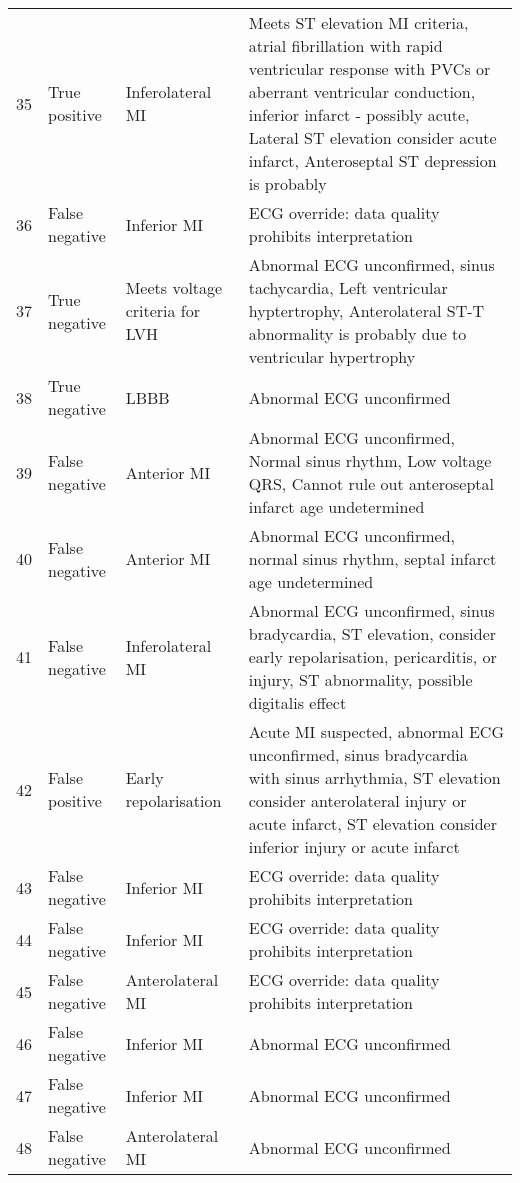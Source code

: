 \begin{longtable}[c]{Lp{0.18\textwidth}AA}
35&True positive&Inferolateral MI&Meets ST elevation MI criteria,  \newline  atrial fibrillation with rapid ventricular response with PVCs or aberrant ventricular conduction,  \newline  inferior infarct - possibly acute, \newline  Lateral ST elevation consider acute infarct, Anteroseptal ST depression is probably \\
36&False negative&Inferior MI&ECG override: data quality prohibits interpretation \\
37&True negative&Meets voltage criteria for LVH&Abnormal ECG unconfirmed, sinus tachycardia,  \newline  Left ventricular hyptertrophy,  \newline  Anterolateral ST-T abnormality is probably due to ventricular hypertrophy \\
38&True negative&LBBB&Abnormal ECG unconfirmed \\
39&False negative&Anterior MI&Abnormal ECG unconfirmed,  \newline  Normal sinus rhythm,  \newline  Low voltage QRS,  \newline  Cannot rule out anteroseptal infarct age undetermined \\
40&False negative&Anterior MI&Abnormal ECG unconfirmed,  \newline  normal sinus rhythm, septal infarct age undetermined \\
41&False negative&Inferolateral MI&Abnormal ECG unconfirmed,  \newline  sinus bradycardia, \newline  ST elevation, consider early repolarisation, pericarditis, or injury,  \newline  ST abnormality, possible digitalis effect \\
42&False positive&Early repolarisation&Acute MI suspected,  \newline  abnormal ECG unconfirmed, \newline  sinus bradycardia with sinus arrhythmia, ST elevation consider anterolateral injury or acute infarct,  \newline  ST elevation consider inferior injury or acute infarct \\
43&False negative&Inferior MI&ECG override: data quality prohibits interpretation \\
44&False negative&Inferior MI&ECG override: data quality prohibits interpretation \\
45&False negative&Anterolateral MI&ECG override: data quality prohibits interpretation \\
46&False negative&Inferior MI&Abnormal ECG unconfirmed \\
47&False negative&Inferior MI&Abnormal ECG unconfirmed \\
48&False negative&Anterolateral MI&Abnormal ECG unconfirmed \\
\end{longtable}
 \renewcommand{\arraystretch}{1}
\normalsize